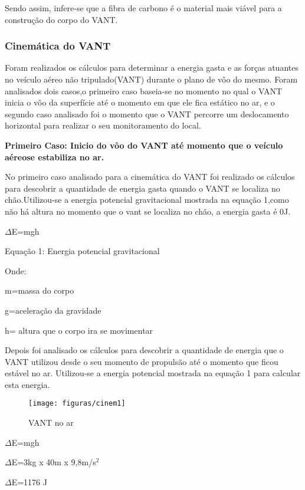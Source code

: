 Sendo assim, infere-se que a fibra de carbono é o material mais viável para a construção do corpo do VANT. \cite{fibracarbono2014}

\subsubsection{Cinemática do VANT}

Foram realizados os cálculos para determinar a energia gasta e as forças atuantes no veículo aéreo não tripulado(VANT) durante o plano de vôo do mesmo. Foram analisados dois casos,o primeiro caso baseia-se no momento no qual o VANT inicia o vôo da superfície até o momento em que ele fica estático no ar, e o segundo caso analisado foi o momento que o VANT percorre um deslocamento horizontal para realizar o seu monitoramento do local.

\textbf{Primeiro Caso: Inicio do vôo do VANT até momento que o veículo aéreose estabiliza no ar.}

No primeiro caso analisado para a cinemática do VANT foi realizado os cálculos para descobrir a quantidade de energia gasta quando o VANT se localiza no chão.Utilizou-se a energia potencial gravitacional mostrada na equação 1,como não há altura no momento que o vant se localiza no chão, a energia gasta é 0J.\cite{halliday1976}

\begin{center}
$\Delta$E=mgh

Equação 1: Energia potencial gravitacional \cite{halliday1976}
\end{center}

Onde:

m=massa do corpo

g=aceleração da gravidade

h= altura que o corpo ira se movimentar

Depois foi analisado os cálculos para descobrir a quantidade de energia que o VANT utilizou desde o seu momento de propulsão até o momento que ficou estável no ar. Utilizou-se a energia potencial mostrada na equação 1 para calcular esta energia.\cite{halliday1976}

\begin{figure}[H]
\centering\texttt{[image: figuras/cinem1]}
\caption{VANT no ar}
\end{figure}

\begin{center}
$\Delta$E=mgh

$\Delta$E=3kg  x 40m x 9,8m/s$^{2}$

$\Delta$E=1176 J
\end{center}

